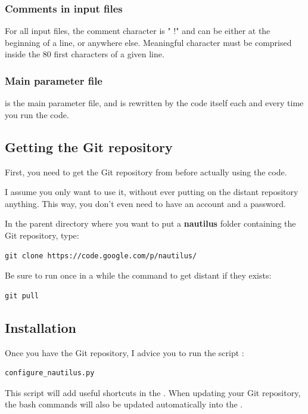 \documentclass[english,a4paper,twoside]{article}
\begin{document}
\subsubsection{Comments in input files}\label{sec:files_generic_info}
For all input files, the comment character is " !" and can be either at the beginning of a line, or anywhere else. Meaningful character must be comprised inside the 80 first characters of a given line.

\subsubsection{Main parameter file}
 is the main parameter file, and is rewritten by the code itself each and every time you run the code. 

\subsection{Getting the Git repository}
First, you need to get the Git repository from  before actually using the code. 

I assume you only want to use it, without ever putting on the distant repository anything. This way, you don't even need to have an account and a password. 

In the parent directory where you want to put a \textbf{nautilus} folder containing the Git repository, type:
\begin{verbatim}
git clone https://code.google.com/p/nautilus/
\end{verbatim}

Be sure to run once in a while the command to get distant  if they exists:
\begin{verbatim}
git pull
\end{verbatim}

\subsection{Installation}\label{sec:installation}
Once you have the Git repository, I advice you to run the script  : 
\begin{verbatim}
configure_nautilus.py
\end{verbatim}

This script will add useful shortcuts in the . When updating your Git repository, the bash commands will also be updated automatically into the .
\end{document}
